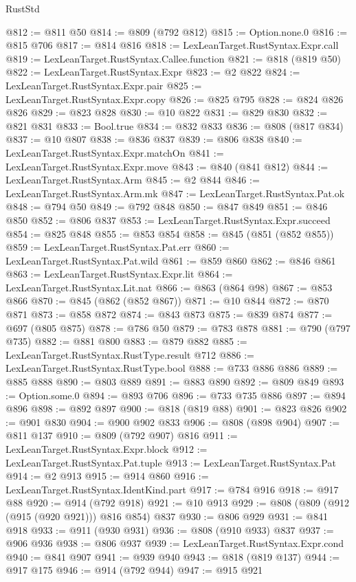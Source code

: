 \begin{lexlean}{RustStd}
\begin{coremodule}
@812 := @811 @50
@814 := @809 (@792 @812)
@815 := Option.none.{0}
@816 := @815 @706
@817 := @814 @816
@818 := LexLeanTarget.RustSyntax.Expr.call
@819 := LexLeanTarget.RustSyntax.Callee.function
@821 := @818 (@819 @50)
@822 := LexLeanTarget.RustSyntax.Expr
@823 := @2 @822
@824 := LexLeanTarget.RustSyntax.Expr.pair
@825 := LexLeanTarget.RustSyntax.Expr.copy
@826 := @825 @795
@828 := @824 @826 @826
@829 := @823 @828
@830 := @10 @822
@831 := @829 @830
@832 := @821 @831
@833 := Bool.true
@834 := @832 @833
@836 := @808 (@817 @834)
@837 := @10 @807
@838 := @836 @837
@839 := @806 @838
@840 := LexLeanTarget.RustSyntax.Expr.matchOn
@841 := LexLeanTarget.RustSyntax.Expr.move
@843 := @840 (@841 @812)
@844 := LexLeanTarget.RustSyntax.Arm
@845 := @2 @844
@846 := LexLeanTarget.RustSyntax.Arm.mk
@847 := LexLeanTarget.RustSyntax.Pat.ok
@848 := @794 @50
@849 := @792 @848
@850 := @847 @849
@851 := @846 @850
@852 := @806 @837
@853 := LexLeanTarget.RustSyntax.Expr.succeed
@854 := @825 @848
@855 := @853 @854
@858 := @845 (@851 (@852 @855))
@859 := LexLeanTarget.RustSyntax.Pat.err
@860 := LexLeanTarget.RustSyntax.Pat.wild
@861 := @859 @860
@862 := @846 @861
@863 := LexLeanTarget.RustSyntax.Expr.lit
@864 := LexLeanTarget.RustSyntax.Lit.nat
@866 := @863 (@864 @98)
@867 := @853 @866
@870 := @845 (@862 (@852 @867))
@871 := @10 @844
@872 := @870 @871
@873 := @858 @872
@874 := @843 @873
@875 := @839 @874
@877 := @697 (@805 @875)
@878 := @786 @50
@879 := @783 @878
@881 := @790 (@797 @735)
@882 := @881 @800
@883 := @879 @882
@885 := LexLeanTarget.RustSyntax.RustType.result @712
@886 := LexLeanTarget.RustSyntax.RustType.bool
@888 := @733 @886 @886
@889 := @885 @888
@890 := @803 @889
@891 := @883 @890
@892 := @809 @849
@893 := Option.some.{0}
@894 := @893 @706
@896 := @733 @735 @886
@897 := @894 @896
@898 := @892 @897
@900 := @818 (@819 @88)
@901 := @823 @826
@902 := @901 @830
@904 := @900 @902 @833
@906 := @808 (@898 @904)
@907 := @811 @137
@910 := @809 (@792 @907) @816
@911 := LexLeanTarget.RustSyntax.Expr.block
@912 := LexLeanTarget.RustSyntax.Pat.tuple
@913 := LexLeanTarget.RustSyntax.Pat
@914 := @2 @913
@915 := @914 @860
@916 := LexLeanTarget.RustSyntax.IdentKind.part
@917 := @784 @916
@918 := @917 @88
@920 := @914 (@792 @918)
@921 := @10 @913
@929 := @808 (@809 (@912 (@915 (@920 @921))) @816 @854) @837
@930 := @806 @929
@931 := @841 @918
@933 := @911 (@930 @931)
@936 := @808 (@910 @933) @837
@937 := @906 @936
@938 := @806 @937
@939 := LexLeanTarget.RustSyntax.Expr.cond
@940 := @841 @907
@941 := @939 @940
@943 := @818 (@819 @137)
@944 := @917 @175
@946 := @914 (@792 @944)
@947 := @915 @921

\end{coremodule}
\end{lexlean}
